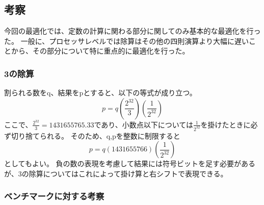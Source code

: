 \subsection{考察}
今回の最適化では、定数の計算に関わる部分に関してのみ基本的な最適化を行った。
一般に、プロセッサレベルでは除算はその他の四則演算より大幅に遅いことから、その部分について特に重点的に最適化を行った。

\subsubsection{3の除算}
割られる数をq、結果をpとすると、以下の等式が成り立つ。
\[p=q\left(\frac{2^{32}}{3}\right)\left(\frac{1}{2^{32}}\right)\]
ここで、\(\frac{2^{32}}{3}=1431655765.33\)であり、小数点以下については\(\frac{1}{2^{32}}\)を掛けたときに必ず切り捨てられる。
そのため、q,pを整数に制限すると
\[p=q\left(1431655766\right)\left(\frac{1}{2^{32}}\right)\]
としてもよい。
負の数の表現を考慮して結果には符号ビットを足す必要があるが、3の除算についてはこれによって掛け算と右シフトで表現できる。

\subsubsection{ベンチマークに対する考察}

